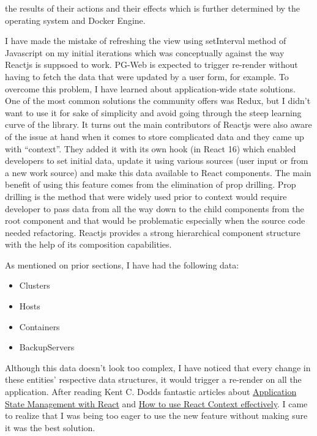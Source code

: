 the results of their actions and their effects which is further determined 
by the operating system and Docker Engine.
\par
I have made the mistake of refreshing the view using setInterval method of 
Javascript on my initial iterations which was conceptually against the way 
Reactjs is suppsoed to work. PG-Web is expected to trigger re-render without 
having to fetch the data that were updated by a user form, for example. To 
overcome this problem, I have learned about application-wide state solutions. 
One of the most common solutions the community offers was Redux, but I didn't 
want to use it for sake of simplicity and avoid going through the steep 
learning curve of the library. It turns out the main contributors of Reactjs 
were also aware of the issue at hand when it comes to store complicated data 
and they came up with ``context''. They added it with its own hook (in React 
16) which enabled developers to set initial data, update it using various 
sources (user input or from a new work source) and make this data available 
to React components. The main benefit of using this feature comes from the 
elimination of prop drilling. Prop drilling is the method that were widely 
used prior to context would require developer to pass data from all the way 
down to the child components from the root component and that would be 
problematic especially when the source code needed refactoring. Reactjs 
provides a strong hierarchical component structure with the help of its 
composition capabilities.
\par
As mentioned on prior sections, I have had the following data:
\begin{itemize}
    \item Clusters
    \item Hosts
    \item Containers
    \item BackupServers
\end{itemize}
Although this data doesn't look too complex, I have noticed that every change 
in these entities' respective data structures, it would trigger a re-render 
on all the application. After reading Kent C. Dodds fantastic articles 
about \href{https://kentcdodds.com/blog/application-state-management-with-react}
{Application State Management with React} and 
\href{https://kentcdodds.com/blog/how-to-use-react-context-effectively}
{How to use React Context effectively}. I came to realize that I was being too 
eager to use the new feature without making sure it was the best solution. 
